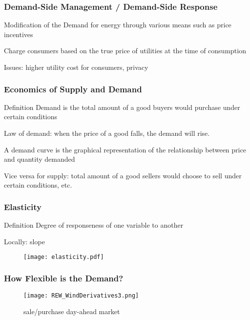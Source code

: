 \documentclass[10pt,dvipsnames]{beamer}
\begin{document}
\begin{frame}
  \frametitle{Demand-Side Management / Demand-Side Response}

  Modification of the Demand for energy through various means such as price incentives

  Charge consumers based on the true price of utilities at the time of consumption

  Issues: higher utility cost for consumers, privacy

\end{frame}


\begin{frame}
 \frametitle{Economics of Supply and Demand}
 \begin{block}{Definition}
  Demand is the total amount of a good buyers would purchase under certain conditions
 \end{block}

 Law of demand: when the price of a good falls, the demand will rise.

 A demand curve is the graphical representation of the relationship between price and quantity demanded

 Vice versa for supply: total amount of a good sellers would choose to sell under certain conditions, etc.
\end{frame}

\begin{frame}
 \frametitle{Elasticity}
 \begin{block}{Definition}
  Degree of responseness of one variable to another
 \end{block}
 Locally: slope
     \begin{figure}
     \texttt{[image: elasticity.pdf]}
  \end{figure}

\end{frame}


\begin{frame}
 \frametitle{How Flexible is the Demand?}
    \begin{figure}
     \texttt{[image: REW\_WindDerivatives3.png]}
     \caption{sale/purchase day-ahead market}
  \end{figure}
\end{frame}
\end{document}
